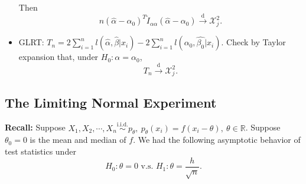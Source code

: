 \documentclass[a4paper]{article}
\begin{document}
\begin{itemize}[leftmargin=*]
\begin{equation*}
	\end{equation*}
	Then
	\begin{equation*}
		n \left(\hat{\alpha} - \alpha_0\right)^T \tilde{I}_{\alpha\alpha} \left(\hat{\alpha} - \alpha_0\right) \stackrel{\text{d}}{\longrightarrow} \mathcal{X}_j^2.
	\end{equation*}
	\item GLRT: $T_n = 2 \sum\limits_{i=1}^n l(\hat{\alpha},\hat{\beta}|x_i) -  2 \sum\limits_{i=1}^n l(\alpha_0,\hat{\beta_0}|x_i)$. Check by Taylor expansion that, under $H_0: \alpha = \alpha_0$,
	\begin{equation*}
		T_n \stackrel{\text{d}}{\longrightarrow} \mathcal{X}_j^2.
	\end{equation*}
\end{itemize}

\subsection{The Limiting Normal Experiment}
\textbf{Recall:} Suppose $X_1,X_2,\cdots,X_n \stackrel{\text{i.i.d.}}{\sim} p_{\theta}, \ p_{\theta}(x_i) = f(x_i-\theta), \ \theta \in \mathbb{R}$. Suppose $\theta_0 = 0$ is the mean and median of $f$. We had the following asymptotic behavior of test statistics under
\begin{equation*}
	H_0: \theta = 0 \text{ v.s. } H_1: \theta =\frac{h}{\sqrt{n}}.
\end{equation*}
\end{document}
